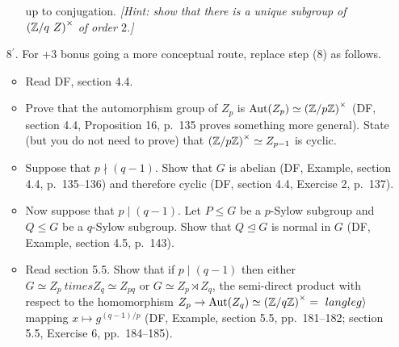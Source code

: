 \begin{Answer}
\begin{enumerate}
\begin{itemize}
    up to conjugation.  \emph{[Hint: show that there is a unique subgroup of ${(\mathbb{Z}/q\
    Z)}^\times$ of order $2$.]}
    \end{itemize}
    \item[{8${}^\prime$.}] For +3 bonus going a more conceptual route, replace step 
    (8) as follows.
    \begin{itemize}
    \item Read DF, section 4.4.  
    \item Prove that the automorphism group of $Z_p$ is $\operatorname{Aut}(Z_p) \simeq
      {(\mathbb{Z}/p\mathbb{Z})}^\times$ (DF, section 4.4, Proposition 16, p.~135 proves something more general).  
    State (but you do not need to prove) that ${(\mathbb{Z}/p\mathbb{Z})}^\times \simeq Z_{p-1}$ is 
    cyclic.  
    \item Suppose that $p \nmid (q-1)$.  Show that $G$ is abelian (DF, Example, section
    4.4, p.~135--136)
    and therefore cyclic (DF, section 4.4, Exercise 2, p.~137).  
    \item Now suppose that $p \mid (q-1)$.  Let $P \leq G$ be a $p$-Sylow subgroup and 
    $Q \leq G$ be a $q$-Sylow subgroup.  Show that $Q \trianglelefteq G$ is normal in 
    $G$ (DF, Example, section 4.5, p.~143).
    \item Read section 5.5.  Show that if $p \mid (q-1)$ then either $G \simeq Z_p \
    times Z_q \simeq Z_{pq}$ or $G \simeq Z_p \rtimes Z_q$, the semi-direct product 
    with respect to the homomorphism $Z_p \to \operatorname{Aut}(Z_q) \simeq {(\mathbb{Z}/q\mathbb{Z})}^\times = \
    langle g \rangle$ mapping $x \mapsto g^{(q-1)/p}$ (DF, Example, section 5.5, 
    pp.~181--182; section 5.5, Exercise 6, pp.~184--185).
    \end{itemize}
  \end{enumerate}
\end{Answer}
